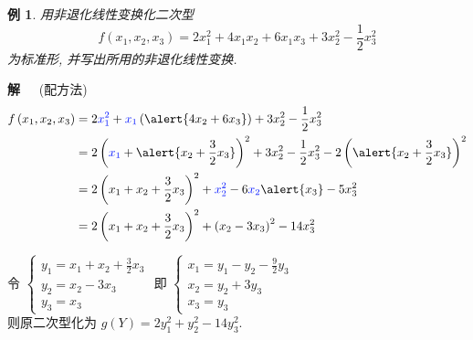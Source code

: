 \documentclass[13pt]{beamer}
\newtheorem{exa}{例}
\def\sol{{\bf 解~~ }}
\newcommand{\blue}{\textcolor{blue}}
\begin{document}
\begin{frame}
\begin{exa}
用非退化线性变换化二次型 $$f\left(x_{1}, x_{2}, x_{3}\right)=2 x_{1}^{2}+4 x_{1} x_{2}+6 x_{1} x_{3}+3 x_{2}^{2}-\frac{1}{2} x_{3}^{2}$$ 为标准形, 并写出所用的非退化线性变换.
\end{exa}
\sol (配方法)
\begin{align*}
f\left(x_{1}, x_{2}, x_{3}\right)
& = 2 \blue{x_{1}^{2}}+ \blue{x_{1}} \left(\alert{4 x_{2}+6 x_{3}}\right) +3 x_{2}^{2}-\frac{1}{2} x_{3}^{2} \\
&=2\left(\blue{x_{1}}+\alert{x_{2}+\frac{3}{2} x_{3}}\right)^{2}+3 x_{2}^{2}-\frac{1}{2} x_{3}^{2}-2\left(\alert{x_{2}+\frac{3}{2} x_{3}}\right)^{2}\\
& =2\left(x_{1}+x_{2}+\frac{3}{2} x_{3}\right)^{2}+\blue{x_{2}^{2}}-6 \blue{x_{2}} \alert{x_{3}} -5 x_{3}^{2}\\
&=2\left(x_{1}+x_{2}+\frac{3}{2} x_{3}\right)^{2}+\left(x_{2}-3 x_{3}\right)^{2}-14 x_{3}^{2} 
\end{align*}
\end{frame}


\begin{frame}
令
$\left\{\begin{array}{l}y_{1}=x_{1}+x_{2}+\frac{3}{2} x_{3} \\ y_{2}=x_{2}-3 x_{3} \\ y_{3}=x_{3}\end{array}\right.$
即
$\left\{\begin{array}{l}x_{1}=y_{1}-y_{2}-\frac{9}{2} y_{3} \\ x_{2}=y_{2}+3 y_{3} \\ x_{3}=y_{3}\end{array}\right.$
\\[6pt]
则原二次型化为 
$g(Y)=2 y_{1}^{2}+y_{2}^{2}-14 y_{3}^{2}$.

\end{frame}
\end{document}
